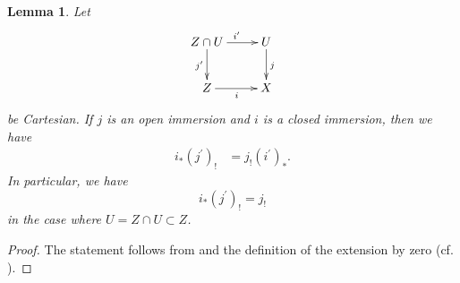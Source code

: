 \documentclass{article}
\newtheorem{lem}[thm]{\indent \sc Lemma}
\begin{document}
%
\begin{lem}\upshape\label{ijdex}
Let
%
\begin{equation*}
\xymatrix{
Z\cap U 
\ar[r]^{i^{\prime}}
\ar[d]_{j^{\prime}}
&
U 
\ar[d]^{j} \\
Z \ar[r]_{i}
&
X
}
\end{equation*}
%
be Cartesian. 
If $j$ is an open immersion 
and $i$ is a closed immersion, 
then we have
%
\begin{align*}
i_{*}(j^{\prime})_{!}
&=
j_{!}(i^{\prime})_{*}.
\end{align*}
%
In particular, we have
%
\begin{equation*}
i_{*}(j^{\prime})_{!}
=
j_{!}
\end{equation*}
%
in the case where $U=Z\cap U\subset Z$.
\end{lem}
%

%
\begin{proof}\upshape
The statement follows from \cite[p.71, II, Corollary 3.5]{M} 
and the definition of the extension by zero (cf. \cite[p.78]{M}).
\end{proof}
%
\end{document}
